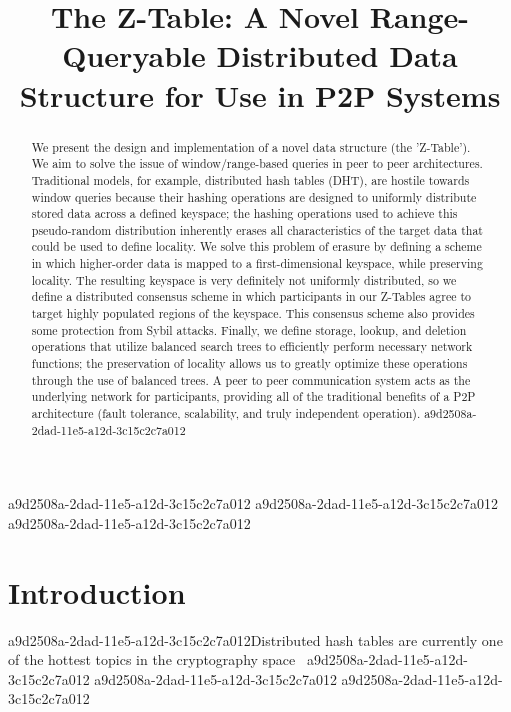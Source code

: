 \documentclass[12pt]{article}
\title{The Z-Table: A Novel Range-Queryable Distributed Data Structure for Use in P2P Systems}
\begin{document}
\maketitle

\begin{abstract}
We present the design and implementation of a novel data structure (the 'Z-Table'). We aim to solve the issue of window/range-based queries in peer to peer architectures. Traditional models, for example,  distributed hash tables (DHT), are hostile towards window queries because their hashing operations are designed to uniformly distribute stored data across a defined keyspace; the hashing operations used to achieve this pseudo-random distribution inherently erases all characteristics of the target data that could be used to define locality. We solve this problem of erasure by defining a scheme in which higher-order data is mapped to a first-dimensional keyspace, while preserving locality. The resulting keyspace is very definitely not uniformly distributed, so we define a distributed consensus scheme in which participants in our Z-Tables agree to target highly populated regions of the keyspace. This consensus scheme also provides some protection from Sybil attacks. Finally, we define storage, lookup, and deletion operations that utilize balanced search trees to efficiently perform necessary network functions; the preservation of locality allows us to greatly optimize these operations through the use of balanced trees. A peer to peer communication system acts as the underlying network for participants, providing all of the traditional benefits of a P2P architecture (fault tolerance, scalability, and truly independent operation).
a9d2508a-2dad-11e5-a12d-3c15c2c7a012\end{abstract}
a9d2508a-2dad-11e5-a12d-3c15c2c7a012
a9d2508a-2dad-11e5-a12d-3c15c2c7a012
\newpage
a9d2508a-2dad-11e5-a12d-3c15c2c7a012\section{Introduction}
a9d2508a-2dad-11e5-a12d-3c15c2c7a012Distributed hash tables are currently one of the hottest topics in the cryptography space~\cite{Stoica:2001dj,Rowstron:2001ea,Ratnasamy:2001wn}
a9d2508a-2dad-11e5-a12d-3c15c2c7a012
a9d2508a-2dad-11e5-a12d-3c15c2c7a012\printbibliography
a9d2508a-2dad-11e5-a12d-3c15c2c7a012
\end{document}
